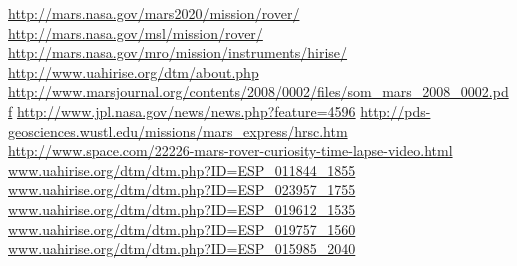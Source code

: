 \documentclass[12pt]{article}
\begin{document}
\pagebreak
\begin{thebibliography}{30}
  \url{http://mars.nasa.gov/mars2020/mission/rover/}
  \url{http://mars.nasa.gov/msl/mission/rover/}
  \url{http://mars.nasa.gov/mro/mission/instruments/hirise/}
  \url{http://www.uahirise.org/dtm/about.php}
  \url{http://www.marsjournal.org/contents/2008/0002/files/som_mars_2008_0002.pdf}
  \url{http://www.jpl.nasa.gov/news/news.php?feature=4596}
  \url{http://pds-geosciences.wustl.edu/missions/mars_express/hrsc.htm}
  \url{http://www.space.com/22226-mars-rover-curiosity-time-lapse-video.html}
  \url{www.uahirise.org/dtm/dtm.php?ID=ESP_011844_1855}
  \url{www.uahirise.org/dtm/dtm.php?ID=ESP_023957_1755}
  \url{www.uahirise.org/dtm/dtm.php?ID=ESP_019612_1535}
  \url{www.uahirise.org/dtm/dtm.php?ID=ESP_019757_1560}
  \url{www.uahirise.org/dtm/dtm.php?ID=ESP_015985_2040}
\end{thebibliography}
\end{document}
